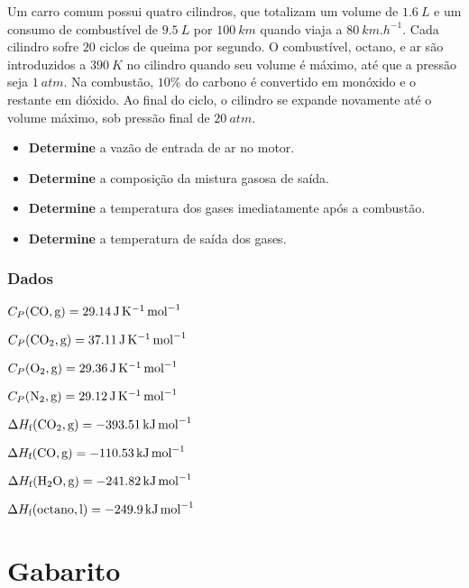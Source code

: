 \documentclass[braun, twocolumn]{braun}
\begin{document}
\begin{problem}
[2A50]Um carro comum possui quatro cilindros, que totalizam um volume de
\(\qty{1,6}{L}\) e um consumo de combustível de \(\qty{9,5}{L}\) por
\(\qty{100}{km}\) quando viaja a \(\qty{80}{km.h^{-1}}\). Cada cilindro sofre
\(20\) ciclos de queima por segundo. O combustível, octano, e ar são
introduzidos a \(\qty{390}{K}\) no cilindro quando seu volume é máximo,
até que a pressão seja \(\qty{1}{atm}\). Na combustão, \(10\%\) do carbono
é convertido em monóxido e o restante em dióxido. Ao final do ciclo, o
cilindro se expande novamente até o volume máximo, sob pressão final de
\(\qty{20}{atm}\).

\begin{itemize}

\item
  \textbf{Determine} a vazão de entrada de ar no motor.
\item
  \textbf{Determine} a composição da mistura gasosa de saída.
\item
  \textbf{Determine} a temperatura dos gases imediatamente após a
  combustão.
\item
  \textbf{Determine} a temperatura de saída dos gases.
\end{itemize}
\subsubsection*{Dados}


\begin{datalist}

\item $C_P(\ce{CO, {g}}) = \qty{29,14}{J.K^{-1}.mol^{-1}}$
\item $C_P(\ce{CO2, {g}}) = \qty{37,11}{J.K^{-1}.mol^{-1}}$
\item $C_P(\ce{O2, {g}}) = \qty{29,36}{J.K^{-1}.mol^{-1}}$
\item $C_P(\ce{N2, {g}}) = \qty{29,12}{J.K^{-1}.mol^{-1}}$
\item $\Delta H_\text{f}(\ce{CO2, {g}}) = \qty{-393,51}{kJ.mol^{-1}}$
\item $\Delta H_\text{f}(\ce{CO, {g}}) = \qty{-110,53}{kJ.mol^{-1}}$
\item $\Delta H_\text{f}(\ce{H2O, {g}}) = \qty{-241,82}{kJ.mol^{-1}}$
\item $\Delta H_\text{f}(\ce{octano, {l}}) = \qty{-249,9}{kJ.mol^{-1}}$
\end{datalist}

\end{problem}
\section{Gabarito}
\end{document}
